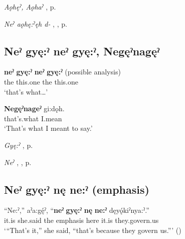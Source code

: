 \begin{CayugaRelated}
\item \textit{Aǫhęˀ, Aǫhaˀ} , p. \pageref{p:[aǫhęˀ]}\\
\item \textit{Neˀ aǫhę:ˀęh d-} , , p. \pageref{p:[neˀ aǫhę:ˀęh d-]}
\end{CayugaRelated}


\subsection*{\textbf{Neˀ gyę:ˀ neˀ gyę:ˀ, Negęˀnagęˀ} } \label{p:[neˀ gyę:ˀ neˀ gyę:ˀ]}

\ea
\label{ex:npar28}
\gll \textbf{neˀ} \textbf{gyę:ˀ} \textbf{neˀ} \textbf{gyę:ˀ} {(possible analysis)}\\
the this.one the this.one {}\\
\glt ‘that’s what…’
\z

\ea
\label{ex:npar29}
\gll \textbf{Negęˀnageˀ} gi:dǫh.\\
that’s.what I.mean\\
\glt ‘That’s what I meant to say.’
\z

\begin{CayugaRelated}
\item \textit{Gyę:ˀ} , p. \pageref{p:[gyę:ˀ]}\\
\item \textit{Neˀ} , , p. \pageref{p:[neˀ]}
\end{CayugaRelated}


\subsection*{\textbf{Neˀ gyę:ˀ nę ne:ˀ} (emphasis)} \label{p:[neˀ gyę:ˀ nę ne:ˀ]}

\ea
\label{ex:npar30}
\gll “Ne:ˀ,” aˀa:gę́ˀ, “\textbf{neˀ} \textbf{gyę:ˀ} \textbf{nę} \textbf{ne:ˀ} dęyǫ́kiˀnya:ˀ.”\\
it.is she.said the emphasis here it.is they.govern.us\\
\glt ‘“That’s it,” she said, “that’s because they govern us.”’ (\cite{henry_de_2005})
\z

